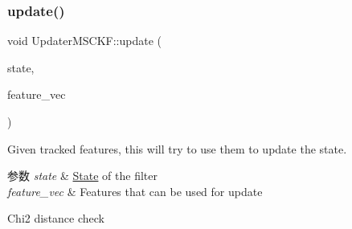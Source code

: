 \subsubsection{\texorpdfstring{update()}{update()}}
{\footnotesize\ttfamily void Updater\+M\+S\+C\+K\+F\+::update (\begin{DoxyParamCaption}\item[{std\+::shared\+\_\+ptr$<$ \hyperlink{classov__msckf_1_1State}{State} $>$}]{state,  }\item[{std\+::vector$<$ std\+::shared\+\_\+ptr$<$ \hyperlink{classov__core_1_1Feature}{ov\+\_\+core\+::\+Feature} $>$$>$ \&}]{feature\+\_\+vec }\end{DoxyParamCaption})}



Given tracked features, this will try to use them to update the state. 


\begin{DoxyParams}{参数}
{\em state} & \hyperlink{classov__msckf_1_1State}{State} of the filter \\
\hline
{\em feature\+\_\+vec} & Features that can be used for update \\
\hline
\end{DoxyParams}
Chi2 distance check 